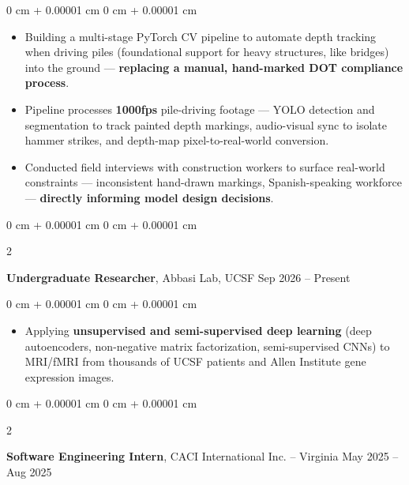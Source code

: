 \documentclass[10pt, letterpaper]{article}
\newenvironment{highlights}{
    \begin{itemize}[
        topsep=0.3 cm,
        parsep=0.09 cm,
        partopsep=0pt,
        itemsep=0.05 cm,
        leftmargin=0 cm + 10pt
    ]
}{
    \end{itemize}
} %
\newenvironment{onecolentry}{
    \begin{adjustwidth}{
        0 cm + 0.00001 cm
    }{
        0 cm + 0.00001 cm
    }
}{
    \end{adjustwidth}
} %
\newenvironment{twocolentry}[2][]{
    \onecolentry
    \def\secondColumn{#2}
    \setcolumnwidth{\fill, 4.5 cm}
    \begin{paracol}{2}
}{
    \switchcolumn \raggedleft \secondColumn
    \end{paracol}
    \endonecolentry
} %
\begin{document}
        \vspace{0.11 cm}
        \begin{onecolentry}
            \begin{highlights}
                \item Building a multi-stage PyTorch CV pipeline to automate depth tracking when driving piles (foundational support for heavy structures, like bridges) into the ground — \textbf{replacing a manual, hand-marked DOT compliance process}.
                \item Pipeline processes \textbf{1000fps} pile-driving footage — YOLO detection and segmentation to track painted depth markings, audio-visual sync to isolate hammer strikes, and depth-map pixel-to-real-world conversion.
                \item Conducted field interviews with construction workers to surface real-world constraints — inconsistent hand-drawn markings, Spanish-speaking workforce — \textbf{directly informing model design decisions}.
            \end{highlights}
        \end{onecolentry}

        \vspace{0.11 cm}

        \begin{twocolentry}{
            Sep 2026 – Present
        }
            \textbf{Undergraduate Researcher}, Abbasi Lab, UCSF\end{twocolentry}

        \vspace{0.11 cm}
        \begin{onecolentry}
            \begin{highlights}
                \item Applying \textbf{unsupervised and semi-supervised deep learning} (deep autoencoders, non-negative matrix factorization, semi-supervised CNNs) to MRI/fMRI from thousands of UCSF patients and Allen Institute gene expression images.
            \end{highlights}
        \end{onecolentry}

        \vspace{0.11 cm}

        \begin{twocolentry}{
            May 2025 – Aug 2025
        }
            \textbf{Software Engineering Intern}, CACI International Inc. -- Virginia\end{twocolentry}
\end{document}
